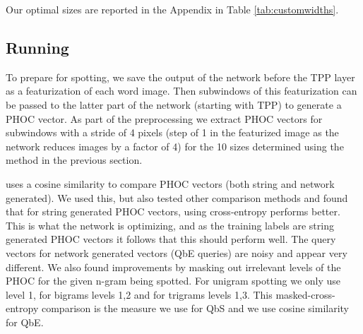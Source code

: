 \documentclass[ms,electronic,twosidetoc,letterpaper,chaptercenter,parttop,lof,lot]{byumsphd}
\begin{document}
Our optimal sizes are reported in the Appendix in Table \ref{tab:customwidths}.


\subsection{Running}

To prepare for spotting, we save the output of the network before the TPP layer as a featurization of each word image. Then subwindows of this featurization can be passed to the latter part of the network (starting with TPP) to generate a PHOC vector. As part of the preprocessing we extract PHOC vectors for subwindows with a stride of 4 pixels (step of 1 in the featurized image as the network reduces images by a factor of 4) for the 10 sizes determined using the method in the previous section.


\cite{sudholt2017} uses a cosine similarity to compare PHOC vectors (both string and network generated). We used this, but also tested other comparison methods and found that for string generated PHOC vectors, using cross-entropy performs better. This is what the network is optimizing, and as the training labels are string generated PHOC vectors it follows that this should perform well. The query vectors for network generated vectors (QbE queries) are noisy and appear very different. We also found improvements by masking out irrelevant levels of the PHOC for the given n-gram being spotted. For unigram spotting we only use level 1, for bigrams levels 1,2 and for trigrams levels 1,3. This masked-cross-entropy comparison is the measure we use for QbS and we use cosine similarity for QbE.
\end{document}
